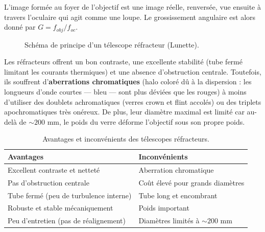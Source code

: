 \documentclass[12pt,a4paper]{report}
\begin{document}
L'image formée au foyer de l'objectif est une image réelle, renversée, vue ensuite à travers l'oculaire qui agit comme une loupe. Le grossissement angulaire est alors donné par $G = f_{obj} / f_{oc}$.
\begin{figure}[H]
    \centering
    \caption{Schéma de principe d'un télescope réfracteur (Lunette).}
    \label{fig:refracteur}
\end{figure}
Les réfracteurs offrent un bon contraste, une excellente stabilité (tube fermé limitant les courants thermiques) et une absence d'obstruction centrale. Toutefois, ils souffrent d'\textbf{aberrations chromatiques} (halo coloré dû à la dispersion : les longueurs d'onde courtes — bleu — sont plus déviées que les rouges) à moins d'utiliser des doublets achromatiques (verres crown et flint accolés) ou des triplets apochromatiques très onéreux. De plus, leur diamètre maximal est limité car au-delà de $\sim 200$ mm, le poids du verre déforme l'objectif sous son propre poids.

\begin{table}[H]
    \centering
    \caption{Avantages et inconvénients des télescopes réfracteurs.}
    \begin{tabular}{|p{6cm}|p{6cm}|}
        \hline
        \textbf{Avantages} & \textbf{Inconvénients} \\
        \hline
        Excellent contraste et netteté & Aberration chromatique \\
        Pas d'obstruction centrale & Coût élevé pour grands diamètres \\
        Tube fermé (peu de turbulence interne) & Tube long et encombrant \\
        Robuste et stable mécaniquement & Poids important \\
        Peu d'entretien (pas de réalignement) & Diamètres limités à $\sim 200$ mm \\
        \hline
    \end{tabular}
\end{table}
\end{document}
